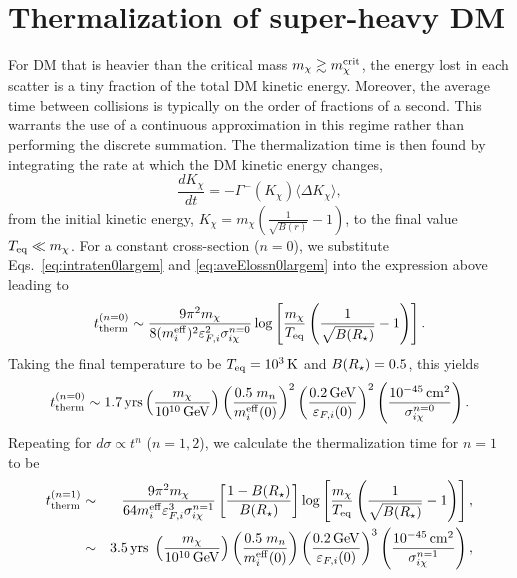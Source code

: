 \section{Thermalization of super-heavy DM}
\label{sec:thermsuperheavy}



For DM that is heavier than the critical mass  $m_\chi\gtrsim m_\chi^{\rm crit}$,
the energy lost in each scatter is a tiny fraction of the total DM kinetic energy. Moreover, the average time between collisions is typically on the order of fractions of a second. This warrants the use of a continuous approximation in this regime rather than performing the discrete summation. The thermalization time is then found by integrating the rate at which the DM kinetic energy changes, 
\begin{equation}
    \frac{dK_\chi}{dt} = -\Gamma^{-}(K_\chi) \langle\Delta K_\chi\rangle,  
    \label{eq:contttherm}
\end{equation}
from the initial kinetic energy, $K_\chi=m_\chi\left(\frac{1}{\sqrt{B(r)}}-1\right)$, to the final value $T_{\rm eq}\ll m_\chi$. For a constant cross-section ($n=0$), we substitute  Eqs.~\ref{eq:intraten0largem} and \ref{eq:aveElossn0largem} into the expression above leading to
\begin{equation}
    t_{\rm therm}^{(n=0)} \sim \frac{9 \pi^2 m_\chi}{8 (m_i^{\rm eff})^2 \varepsilon_{F,i}^2 \sigma_{i\chi}^{n=0}}\log\left[\frac{m_\chi}{T_{\rm eq}}\left(\frac{1}{\sqrt{B(R_\star)}}-1\right)\right].
    \label{eq:tthemheavy0}
\end{equation}
Taking the final temperature to be $T_{\rm eq}=10^3{\rm \,K}$ and $B(R_\star)=0.5$, this yields 
\begin{equation}
    t_{\rm therm}^{(n=0)} \sim 1.7  {\rm \,yrs} \left(\frac{m_\chi }{10^{10}{\rm \,GeV}}\right)\left(\frac{0.5\;m_n}{m_i^{\rm eff}(0)}\right)^{2}\left(\frac{0.2{\rm \,GeV}}{\varepsilon_{F,i}(0)}\right)^{2}\left(\frac{10^{-45}{\rm \,cm}^2}{\sigma_{i\chi}^{n=0}}\right).    
\end{equation}
%
Repeating for $d\sigma\propto t^n$ ($n=1,2$), we calculate the thermalization time for $n=1$ to be
\begin{eqnarray}
    t_{\rm therm}^{(n=1)} &\sim& \frac{9\pi^2 m_\chi}{ 64 m_i^{\rm eff} \varepsilon_{F,i}^3 \sigma_{i\chi}^{n=1}}\left[\frac{1-B(R_\star)}{B(R_\star)}\right] \log\left[\frac{m_\chi}{T_{\rm eq}} \left(\frac{1}{\sqrt{B(R_\star)}}-1\right)\right],\\
    &\sim& 3.5 {\rm \,yrs}\; \left(\frac{m_\chi}{10^{10} {\rm \,GeV}}\right)\left(\frac{0.5\;m_n}{m_i^{\rm eff}(0)}\right) \left(\frac{0.2{\rm \,GeV}}{\varepsilon_{F,i}(0)}\right)^{3}\left(\frac{10^{-45}{\rm \,cm}^2}{\sigma_{i\chi}^{n=1}}\right),
\end{eqnarray}
